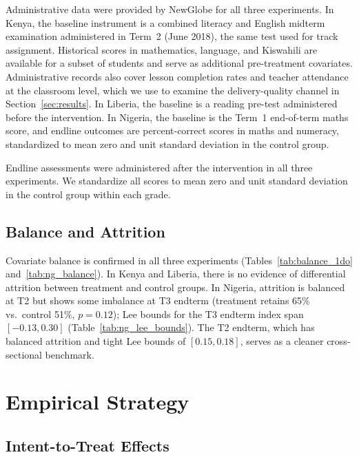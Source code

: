 \documentclass[11pt]{article}
\begin{document}
Administrative data were provided by NewGlobe for all three experiments. In Kenya, the baseline instrument is a combined literacy and English midterm examination administered in Term~2 (June 2018), the same test used for track assignment. Historical scores in mathematics, language, and Kiswahili are available for a subset of students and serve as additional pre-treatment covariates. Administrative records also cover lesson completion rates and teacher attendance at the classroom level, which we use to examine the delivery-quality channel in Section~\ref{sec:results}. In Liberia, the baseline is a reading pre-test administered before the intervention. In Nigeria, the baseline is the Term~1 end-of-term maths score, and endline outcomes are percent-correct scores in maths and numeracy, standardized to mean zero and unit standard deviation in the control group.

Endline assessments were administered after the intervention in all three experiments. We standardize all scores to mean zero and unit standard deviation in the control group within each grade.

\subsection{Balance and Attrition}

Covariate balance is confirmed in all three experiments (Tables~\ref{tab:balance_1do} and~\ref{tab:ng_balance}). In Kenya and Liberia, there is no evidence of differential attrition between treatment and control groups. In Nigeria, attrition is balanced at T2 but shows some imbalance at T3 endterm (treatment retains 65\% vs.\ control 51\%, $p = 0.12$); Lee bounds for the T3 endterm index span $[-0.13, 0.30]$ (Table~\ref{tab:ng_lee_bounds}). The T2 endterm, which has balanced attrition and tight Lee bounds of $[0.15, 0.18]$, serves as a cleaner cross-sectional benchmark.


\section{Empirical Strategy}
\label{sec:strategy}

\subsection{Intent-to-Treat Effects}
\end{document}
